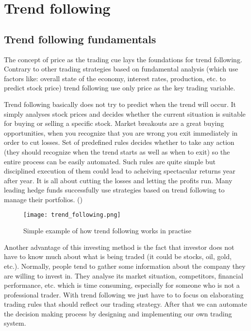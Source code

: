 

\section{Trend following}
\label{sec:trendFollowing}

\subsection{Trend following fundamentals}
\label{sec:trend_following_fundamentals}

The concept of price as the trading cue lays the foundations for trend following. 
Contrary to other trading strategies based on fundamental analysis (which use factors like: overall state of the economy, interest rates, production, etc. to predict stock price)
trend following use only price as the key trading variable. 

Trend following basically does not try to predict when the trend will occur. 
It simply analyses stock prices and decides whether the current situation is suitable for buying or selling a specific stock.
Market breakouts are a great buying opportunities, when you recognize that you are wrong you exit immediately in order to cut losses.
Set of predefined rules decides  whether to take any action (they should recognize when the trend starts as well as when to exit) so the entire process can be easily automated.
Such rules are quite simple but disciplined execution of them could lead to acheiving spectacular returns year after year.
It is all about cutting the losses and letting the profits run.
Many leading hedge funds successfully use strategies based on trend following to manage their portfolios. (\cite{Trend01})  

\newpage
\begin{figure}[ht]
  \begin{center}
    \texttt{[image: trend\_following.png]}
  \end{center}
  \caption{Simple example of how trend following works in practise}
\end{figure}

Another advantage of this investing method is the fact that investor does not have to know much about what is being traded (it could be stocks, oil, gold, etc.).
Normally, people tend to gather some information about the company they are willing to invest in. 
They analyse its market situation, competitors, financial performance, etc. which is time consuming, especially for someone who is not a professional trader.
With trend following we just have to to focus on elaborating trading rules that should reflect our trading strategy.
After that we can automate the decision making process by designing and implementing our own trading system.   


